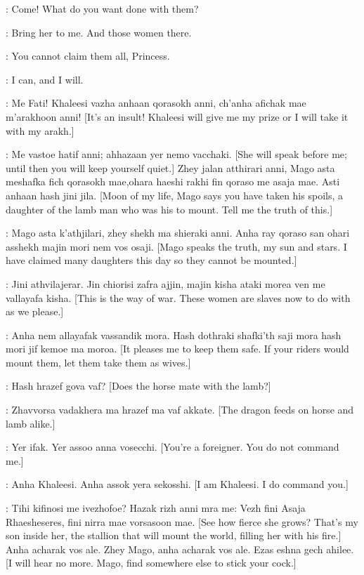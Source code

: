 
\JORAH: Come!  What do you want done with them? 

\DAENERYS: Bring her to me. And those women there. 

\JORAH: You cannot claim them all, Princess. 

\DAENERYS: I can, and I will. 


\MAGO: Me Fati! Khaleesi vazha anhaan qorasokh anni, ch'anha afichak mae m'arakhoon anni! [It's an insult! Khaleesi will give me my prize or I will take it with my arakh.] 

\DROGO: Me vastoe hatif anni; ahhazaan yer nemo vacchaki. [She will speak before me; until then you will keep yourself quiet.]   Zhey jalan atthirari anni, Mago asta meshafka fich qorasokh mae,ohara haeshi rakhi fin qoraso me asaja mae. Asti anhaan hash jini jila. [Moon of my life, Mago says you have taken his spoils, a daughter of the lamb man who was his to mount. Tell me the truth of this.] 

\DAENERYS: Mago asta k'athjilari, zhey shekh ma shieraki anni. Anha ray qoraso san ohari asshekh majin mori nem vos osaji. [Mago speaks the truth, my sun and stars. I have claimed many daughters this day so they cannot be mounted.] 

\DROGO: Jini athvilajerar. Jin chiorisi zafra ajjin, majin kisha ataki morea ven me vallayafa kisha. [This is the way of war. These women are slaves now to do with as we please.] 

\DAENERYS: Anha nem allayafak vassandik mora. Hash dothraki shafki'th saji mora hash mori jif kemoe ma moroa. [It pleases me to keep them safe. If your riders would mount them, let them take them as wives.] 

\QOTHO: Hash hrazef gova vaf? [Does the horse mate with the lamb?] 

\DAENERYS: Zhavvorsa vadakhera ma hrazef ma vaf akkate. [The dragon feeds on horse and lamb alike.] 

\MAGO: Yer ifak. Yer assoo anna vosecchi. [You're a foreigner. You do not command me.] 

\DAENERYS: Anha Khaleesi. Anha assok yera sekosshi. [I am Khaleesi. I do command you.] 

\DROGO: Tihi kifinosi me ivezhofoe? Hazak rizh anni mra me: Vezh fini Asaja Rhaesheseres, fini nirra mae vorsasoon mae. [See how fierce she grows? That's my son inside her, the stallion that will mount the world, filling her with his fire.] Anha acharak vos ale. Zhey Mago, anha acharak vos ale. Ezas eshna gech ahilee. [I will hear no more. Mago, find somewhere else to stick your cock.] 

